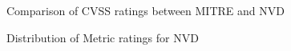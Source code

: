 \documentclass[12pt]{article}
\begin{document}
\begin{figure}[H]
	\centering
	\caption{\label{fig:counts}Comparison of CVSS ratings between MITRE and NVD}
\end{figure}

\begin{figure}[H]
	\centering
	\caption{\label{fig:nvd_data}Distribution of Metric ratings for NVD}
\end{figure}
\end{document}
